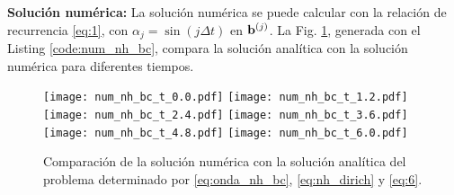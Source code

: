 \documentclass[11pt]{article}
\begin{document}
{\bf Soluci\'on num\'erica:} La soluci\'on num\'erica se puede calcular con la relaci\'on de recurrencia \eqref{eq:1}, con $\alpha_j = \sin(j\Delta t)$ en ${\bf b}^{(j)}$. La Fig. \ref{fig:num_nh_bc}, generada con el Listing \ref{code:num_nh_bc}, compara la soluci\'on anal\'itica con la soluci\'on num\'erica para diferentes tiempos.

\begin{figure}[h]
  \centering
    \texttt{[image: num\_nh\_bc\_t\_0.0.pdf]} 
  \texttt{[image: num\_nh\_bc\_t\_1.2.pdf]} \\
  \texttt{[image: num\_nh\_bc\_t\_2.4.pdf]} 
  \texttt{[image: num\_nh\_bc\_t\_3.6.pdf]} \\
  \texttt{[image: num\_nh\_bc\_t\_4.8.pdf]}
  \texttt{[image: num\_nh\_bc\_t\_6.0.pdf]}
  \caption{Comparaci\'on de la soluci\'on num\'erica con la soluci\'on anal\'itica del problema determinado por \eqref{eq:onda_nh_bc}, \eqref{eq:nh_dirich} y \eqref{eq:6}.}
  \label{fig:num_nh_bc}
\end{figure}


\end{document}
